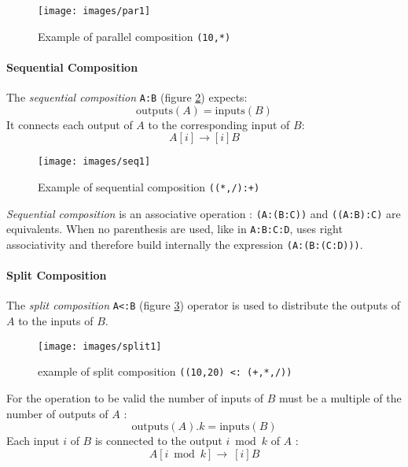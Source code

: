 \begin{figure}[h]
\centering
\texttt{[image: images/par1]}
\caption{Example of parallel composition  \lstinline'(10,*)'}
\label{figure-par1}
\end{figure}


\paragraph{Sequential Composition}
The \emph{sequential composition}  \lstinline$A:B$ (figure \ref{figure-seq1}) expects:
\begin{equation}
\mathrm{outputs}(A)=\mathrm{inputs}(B)
\end{equation}  
It connects each output of  $A$ to the corresponding input of $B$: 
\begin{equation}
A[i]\rightarrow[i]B
\end{equation}  

\begin{figure}[h]
\centering 
\texttt{[image: images/seq1]}
\caption{Example of sequential composition  \lstinline'((*,/):+)' } 
\label{figure-seq1}
\end{figure}

\emph{Sequential composition} is an associative operation : \lstinline$(A:(B:C))$ and \lstinline$((A:B):C)$ are equivalents. When no parenthesis are used, like in \lstinline$A:B:C:D$, \faust uses right associativity and therefore build internally the expression \lstinline$(A:(B:(C:D)))$.

\paragraph{Split Composition}
The \emph{split composition}  \lstinline$A<:B$ (figure \ref{figure-split1}) operator is used to distribute the outputs
of $A$ to the inputs of $B$.

\begin{figure}[h]
\centering 
\texttt{[image: images/split1]} 
\caption{example of split composition   \lstinline'((10,20) <: (+,*,/))'}  
\label{figure-split1}
\end{figure}

For the operation to be valid the number of inputs of $B$ must be a multiple of the number of outputs of $A$ : \begin{equation}
\mathrm{outputs}(A).k=\mathrm{inputs}(B)                                                                                                                                                         \end{equation}
Each input $i$ of $B$ is connected to the output $i \bmod k$ of $A$ : 
\begin{equation}
A[i \bmod k]\rightarrow\ [i]B                                                                                                                                                                                                                                                                                                                       \end{equation}


